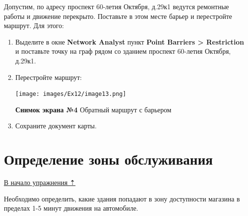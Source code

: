 \documentclass[12pt,]{book}
\begin{document}
Допустим, по адресу проспект 60-летия Октября, д.29к1 ведутся ремонтные работы и движение перекрыто. Поставьте в этом месте барьер и перестройте маршрут. Для этого:

\begin{enumerate}
\def\labelenumi{\arabic{enumi}.}
\item
  Выделите в окне \textbf{Network Analyst} пункт \textbf{Point Barriers \textgreater{} Restriction} и поставьте точку на граф рядом со зданием проспект 60-летия Октября, д.29к1.
\item
  Перестройте маршрут:

  \texttt{[image: images/Ex12/image13.png]}

  \textbf{Снимок экрана №4} Обратный маршрут с барьером
\item
  Сохраните документ карты.
\end{enumerate}

\hypertarget{network-analysis-servicearea}{%
\section{Определение зоны обслуживания}\label{network-analysis-servicearea}}

\protect\hyperlink{network-analysis}{В начало упражнения ⇡}

Необходимо определить, какие здания попадают в зону доступности магазина в пределах 1-5 минут движения на автомобиле.
\end{document}
